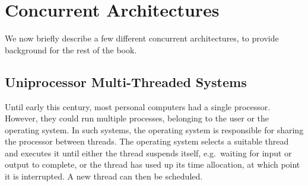 
\section{Concurrent Architectures}

We now briefly describe a few different concurrent architectures, to provide
background for the rest of the book.


\subsection{Uniprocessor Multi-Threaded Systems}

Until early this century, most personal computers had a single processor.
However, they could run multiple processes, belonging to the user or the
operating system.
%
In such systems, the operating system is responsible for sharing the processor
between threads.  The operating system selects a suitable thread and executes
it until either the thread suspends itself, e.g.~waiting for input or output
to complete, or the thread has used up its time allocation, at which point it
is interrupted.  A new thread can then be scheduled.


